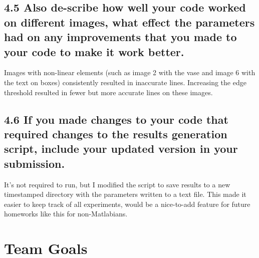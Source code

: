 \documentclass[12pt]{article}
\begin{document}
\subsection{4.5 Also de-scribe how well your code worked on different images, what effect the parameters had on any improvements that you made to your code to make it work better. }
Images with non-linear elements (such as image 2 with the vase and image 6 with the text on boxes) consistently resulted in inaccurate lines. Increasing the edge threshold resulted in fewer but more accurate lines on these images.

\subsection{4.6 If you made changes to your code that required changes to the results generation script, include your updated version in your submission.  }
It's not required to run, but I modified the script to save results to a new timestamped directory with the parameters written to a text file. This made it easier to keep track of all experiments, would be a nice-to-add feature for future homeworks like this for non-Matlabians.

\newpage


\section{Team Goals}
\end{document}
